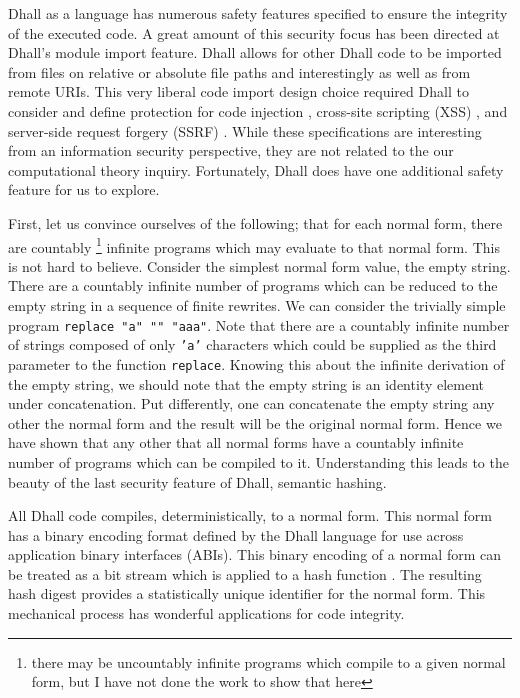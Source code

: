 \documentclass[12pt]{diazessay}
\begin{document}
Dhall as a language has numerous safety features specified to ensure the integrity of the executed code.
A great amount of this security focus has been directed at Dhall's module import feature.
Dhall allows for other Dhall code to be imported from files on relative or absolute file paths and interestingly as well as from remote URIs.
This very liberal code import design choice required Dhall to consider and define protection for code injection \cite{ray2012defining}, cross-site scripting (XSS) \cite{klein2005dom}, and server-side request forgery (SSRF) \cite{huang2003web}.
While these specifications are interesting from an information security perspective, they are not related to the our computational theory inquiry.
Fortunately, Dhall does have one additional safety feature for us to explore.

First, let us convince ourselves of the following; that for each normal form, there are countably \footnote{there may be uncountably infinite programs which compile to a given normal form, but I have not done the work to show that here} infinite programs which may evaluate to that normal form.
This is not hard to believe.
Consider the simplest normal form value, the empty string.
There are a countably infinite number of programs which can be reduced to the empty string in a sequence of finite rewrites.
We can consider the trivially simple program \texttt{replace "a" "" "aaa"}.
Note that there are a countably infinite number of strings composed of only \texttt{'a'} characters which could be supplied as the third parameter to the function \texttt{replace}.
Knowing this about the infinite derivation of the empty string, we should note that the empty string is an identity element under concatenation.
Put differently, one can concatenate the empty string any other the normal form and the result will be the original normal form.
Hence we have shown that any other that all normal forms have a countably infinite number of programs which can be compiled to it.
Understanding this leads to the beauty of the last security feature of Dhall, semantic hashing.

All Dhall code compiles, deterministically, to a normal form.
This normal form has a binary encoding format defined by the Dhall language for use across application binary interfaces (ABIs).
This binary encoding of a normal form can be treated as a bit stream which is applied to a hash function \cite{knuth1973sorting}.
The resulting hash digest provides a statistically unique identifier for the normal form.
This mechanical process has wonderful applications for code integrity.
\end{document}
